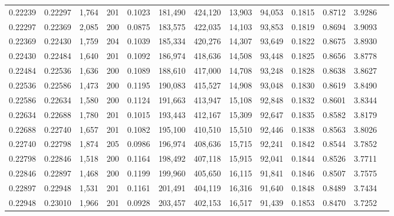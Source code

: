 \begin{tabular}{rrrrrrrrrrrrr}
0.22239 & 0.22297 & 1,764 & 201 &                                     0.1023 & 181,490 & 424,120 &  13,903 &  94,053 & 0.1815 & 0.8712 & 3.9286 \\
0.22297 & 0.22369 & 2,085 & 200 &                                     0.0875 & 183,575 & 422,035 &  14,103 &  93,853 & 0.1819 & 0.8694 & 3.9093 \\
0.22369 & 0.22430 & 1,759 & 204 &                                     0.1039 & 185,334 & 420,276 &  14,307 &  93,649 & 0.1822 & 0.8675 & 3.8930 \\
0.22430 & 0.22484 & 1,640 & 201 &                                     0.1092 & 186,974 & 418,636 &  14,508 &  93,448 & 0.1825 & 0.8656 & 3.8778 \\
0.22484 & 0.22536 & 1,636 & 200 &                                     0.1089 & 188,610 & 417,000 &  14,708 &  93,248 & 0.1828 & 0.8638 & 3.8627 \\
0.22536 & 0.22586 & 1,473 & 200 &                                     0.1195 & 190,083 & 415,527 &  14,908 &  93,048 & 0.1830 & 0.8619 & 3.8490 \\
0.22586 & 0.22634 & 1,580 & 200 &                                     0.1124 & 191,663 & 413,947 &  15,108 &  92,848 & 0.1832 & 0.8601 & 3.8344 \\
0.22634 & 0.22688 & 1,780 & 201 &                                     0.1015 & 193,443 & 412,167 &  15,309 &  92,647 & 0.1835 & 0.8582 & 3.8179 \\
0.22688 & 0.22740 & 1,657 & 201 &                                     0.1082 & 195,100 & 410,510 &  15,510 &  92,446 & 0.1838 & 0.8563 & 3.8026 \\
0.22740 & 0.22798 & 1,874 & 205 &                                     0.0986 & 196,974 & 408,636 &  15,715 &  92,241 & 0.1842 & 0.8544 & 3.7852 \\
0.22798 & 0.22846 & 1,518 & 200 &                                     0.1164 & 198,492 & 407,118 &  15,915 &  92,041 & 0.1844 & 0.8526 & 3.7711 \\
0.22846 & 0.22897 & 1,468 & 200 &                                     0.1199 & 199,960 & 405,650 &  16,115 &  91,841 & 0.1846 & 0.8507 & 3.7575 \\
0.22897 & 0.22948 & 1,531 & 201 &                                     0.1161 & 201,491 & 404,119 &  16,316 &  91,640 & 0.1848 & 0.8489 & 3.7434 \\
0.22948 & 0.23010 & 1,966 & 201 &                                     0.0928 & 203,457 & 402,153 &  16,517 &  91,439 & 0.1853 & 0.8470 & 3.7252 \\

\end{tabular}
